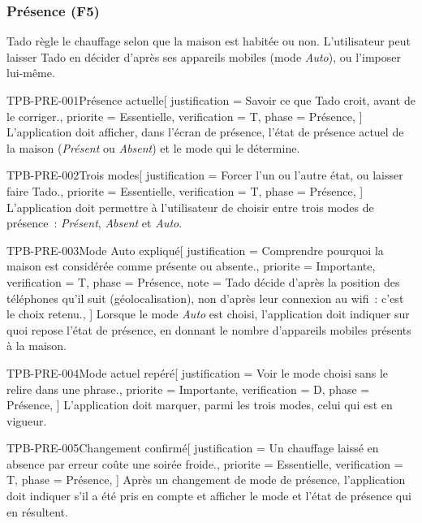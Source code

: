 \subsubsection{Présence (F5)}
\label{sec:presence}

Tado règle le chauffage selon que la maison est habitée ou non. L'utilisateur peut laisser
Tado en décider d'après ses appareils mobiles (mode \emph{Auto}), ou l'imposer lui-même.

\begin{exigence}{TPB-PRE-001}{Présence actuelle}[
    justification = {Savoir ce que Tado croit, avant de le corriger.},
    priorite      = {Essentielle},
    verification  = {T},
    phase         = {Présence},
  ]
  L'application doit afficher, dans l'écran de présence, l'état de présence actuel de la
  maison (\emph{Présent} ou \emph{Absent}) et le mode qui le détermine.
\end{exigence}

\begin{exigence}{TPB-PRE-002}{Trois modes}[
    justification = {Forcer l'un ou l'autre état, ou laisser faire Tado.},
    priorite      = {Essentielle},
    verification  = {T},
    phase         = {Présence},
  ]
  L'application doit permettre à l'utilisateur de choisir entre trois modes de présence~:
  \emph{Présent}, \emph{Absent} et \emph{Auto}.
\end{exigence}

\begin{exigence}{TPB-PRE-003}{Mode Auto expliqué}[
    justification = {Comprendre pourquoi la maison est considérée comme présente ou
                     absente.},
    priorite      = {Importante},
    verification  = {T},
    phase         = {Présence},
    note          = {Tado décide d'après la position des téléphones qu'il suit (géolocalisation),
                     non d'après leur connexion au wifi~: c'est le choix retenu.},
  ]
  Lorsque le mode \emph{Auto} est choisi, l'application doit indiquer sur quoi repose
  l'état de présence, en donnant le nombre d'appareils mobiles présents à la maison.
\end{exigence}

\begin{exigence}{TPB-PRE-004}{Mode actuel repéré}[
    justification = {Voir le mode choisi sans le relire dans une phrase.},
    priorite      = {Importante},
    verification  = {D},
    phase         = {Présence},
  ]
  L'application doit marquer, parmi les trois modes, celui qui est en vigueur.
\end{exigence}

\begin{exigence}{TPB-PRE-005}{Changement confirmé}[
    justification = {Un chauffage laissé en absence par erreur coûte une soirée froide.},
    priorite      = {Essentielle},
    verification  = {T},
    phase         = {Présence},
  ]
  Après un changement de mode de présence, l'application doit indiquer s'il a été pris en
  compte et afficher le mode et l'état de présence qui en résultent.
\end{exigence}
